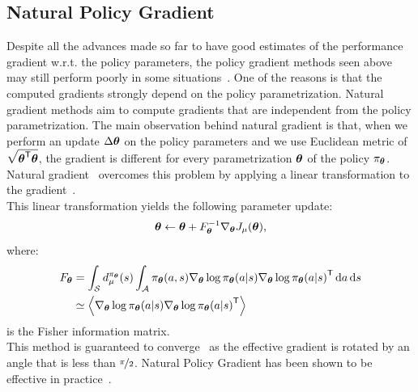 \subsection{Natural Policy Gradient}
Despite all the advances made so far to have good estimates of the performance gradient w.r.t. the policy parameters, the policy gradient methods seen above may still perform poorly in some situations~\cite{peters}. One of the reasons is that the computed gradients strongly depend on the policy parametrization. Natural gradient methods aim to compute gradients that are independent from the policy parametrization. The main observation behind natural gradient is that, when we perform an update $\Delta{\boldsymbol{\theta}}$ on the policy parameters and we use Euclidean metric of $\sqrt{{{\boldsymbol{\theta}}}^{\mathsf{T}}{\boldsymbol{\theta}}}$, the gradient is different for every parametrization ${\boldsymbol{\theta}}$ of the policy $\pi_{{\boldsymbol{\theta}}}$. Natural gradient~\cite{natural} overcomes this problem by applying a linear transformation to the gradient~\cite{peters}.\\
This linear transformation yields the following parameter update:
\[
{\boldsymbol{\theta}} \gets {\boldsymbol{\theta}} + F_{{\boldsymbol{\theta}}}^{-1}\nabla_{{\boldsymbol{\theta}}}J_\mu({\boldsymbol{\theta}}),
\]
where:
\begin{align*}
F_{{\boldsymbol{\theta}}} &= \int_{\mathcal{S}}d_\mu^{\pi_{{\boldsymbol{\theta}}}}(s)\int_{\mathcal{A}}\pi_{{\boldsymbol{\theta}}}(a,s)\nabla_{{\boldsymbol{\theta}}}\log\pi_{{\boldsymbol{\theta}}}(a|s){\nabla_{{\boldsymbol{\theta}}}\log\pi_{{\boldsymbol{\theta}}}(a|s)}^{\mathsf{T}}\, \textrm{d} a \, \textrm{d} s
\\&\simeq \left\langle \nabla_{{\boldsymbol{\theta}}}\log\pi_{{\boldsymbol{\theta}}}(a|s){\nabla_{{\boldsymbol{\theta}}}\log\pi_{{\boldsymbol{\theta}}}(a|s)}^{\mathsf{T}} \right\rangle
\end{align*}
is the Fisher information matrix.\\
This method is guaranteed to converge~\cite{Amari:1998:NGW:287476.287477} as the effective gradient is rotated by an angle that is less than $\nicefrac{\pi}{2}$. Natural Policy Gradient has been shown to be effective in practice~\cite{PETERS20081180}.